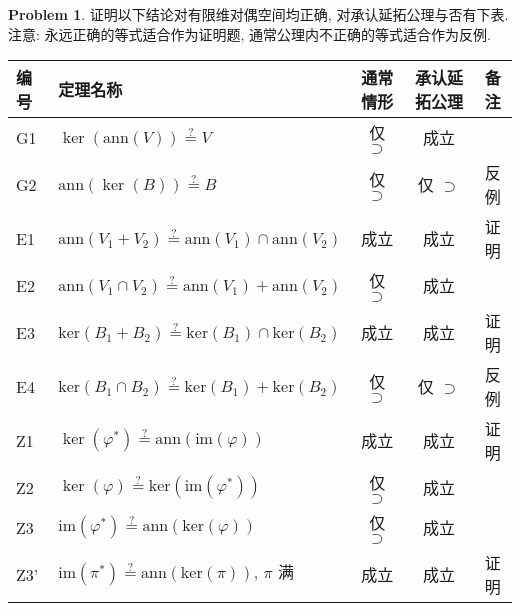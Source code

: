 \documentclass{MainStyle}
\theoremstyle{definition}
\newtheorem{problem}{Problem}
\begin{document}
\begin{problem}
证明以下结论对有限维对偶空间均正确, 对承认延拓公理与否有下表.注意: 永远正确的等式适合作为证明题, 通常公理内不正确的等式适合作为反例.
\vspace{6mm}
\begin{center}
    \setlength{\tabcolsep}{6pt} %
    \renewcommand{\arraystretch}{1.5} %
    \begin{tabular}{||l|l|c|c|c||}
        \hline
        编号 & 定理名称                                                                          & 通常情形     & 承认延拓公理 & 备注 \\ [0.5ex]
        \hline\hline
        G1   & $\ker(\mathrm{ann}(V))\overset ?=V$                                               & 仅 $\supset$ & 成立         &      \\
        \hline
        G2   & $\mathrm{ann}(\ker(B))\overset ?=B$                                               & 仅 $\supset$ & 仅 $\supset$ & 反例 \\
        \hline
        E1   & $\mathrm{ann}(V_1+V_2)\overset ?=\mathrm{ann}(V_1)\cap \mathrm{ann}(V_2)$         & 成立         & 成立         & 证明 \\
        \hline
        E2   & $\mathrm{ann}(V_1\cap V_2)\overset ?=\mathrm{ann}(V_1)+ \mathrm{ann}(V_2)$        & 仅 $\supset$ & 成立         &      \\
        \hline
        E3   & $\mathrm{ker}(B_1+ B_2)\overset ?=\mathrm{ker}(B_1)\cap \mathrm{ker}(B_2)$        & 成立         & 成立         & 证明 \\
        \hline
        E4   & $\mathrm{ker}(B_1\cap B_2)\overset ?=\mathrm{ker}(B_1)+ \mathrm{ker}(B_2)$        & 仅 $\supset$ & 仅 $\supset$ & 反例 \\
        \hline
        Z1   & $\ker(\varphi^\ast)\overset ?=\mathrm{ann}(\mathrm{im}(\varphi))$                 & 成立         & 成立         & 证明 \\
        \hline
        Z2   & $\ker(\varphi)\overset ?=\mathrm{ker}(\mathrm{im}(\varphi^\ast))$                 & 仅 $\supset$ & 成立         &      \\
        \hline
        Z3   & $\mathrm{im}(\varphi^\ast)\overset ?=\mathrm{ann}(\mathrm{ker}(\varphi))$         & 仅 $\supset$ & 成立         &      \\
        \hline
        Z3'  & $\mathrm{im}(\pi^\ast)\overset ?=\mathrm{ann}(\mathrm{ker}(\pi)),\,\pi\text{ 满}$ & 成立         & 成立         & 证明 \\

\end{tabular}
\end{center}
\end{problem}
\end{document}
